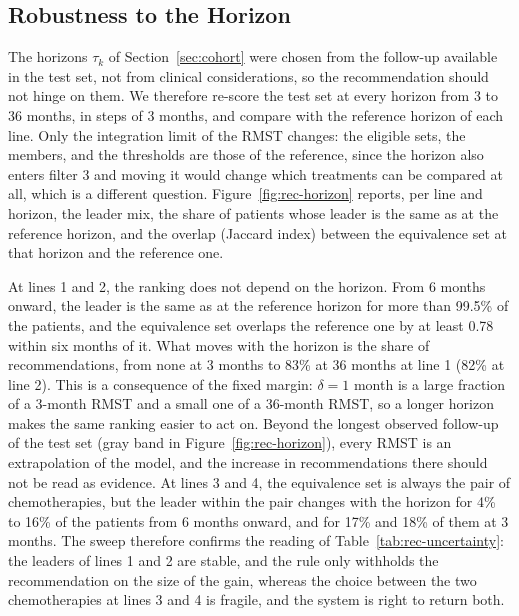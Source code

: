 \documentclass[a4paper,10pt]{article}
\begin{document}
\subsection{Robustness to the Horizon}
\label{sec:rec-horizon}

The horizons $\tau_k$ of Section~\ref{sec:cohort} were chosen from the follow-up available in the test set, not from clinical considerations, so the recommendation should not hinge on them. We therefore re-score the test set at every horizon from 3 to 36 months, in steps of 3 months, and compare with the reference horizon of each line. Only the integration limit of the RMST changes: the eligible sets, the members, and the thresholds are those of the reference, since the horizon also enters filter 3 and moving it would change which treatments can be compared at all, which is a different question. Figure~\ref{fig:rec-horizon} reports, per line and horizon, the leader mix, the share of patients whose leader is the same as at the reference horizon, and the overlap (Jaccard index) between the equivalence set at that horizon and the reference one.

At lines 1 and 2, the ranking does not depend on the horizon. From 6 months onward, the leader is the same as at the reference horizon for more than 99.5\% of the patients, and the equivalence set overlaps the reference one by at least 0.78 within six months of it. What moves with the horizon is the share of recommendations, from none at 3 months to 83\% at 36 months at line 1 (82\% at line 2). This is a consequence of the fixed margin: $\delta = 1$ month is a large fraction of a 3-month RMST and a small one of a 36-month RMST, so a longer horizon makes the same ranking easier to act on. Beyond the longest observed follow-up of the test set (gray band in Figure~\ref{fig:rec-horizon}), every RMST is an extrapolation of the model, and the increase in recommendations there should not be read as evidence. At lines 3 and 4, the equivalence set is always the pair of chemotherapies, but the leader within the pair changes with the horizon for 4\% to 16\% of the patients from 6 months onward, and for 17\% and 18\% of them at 3 months. The sweep therefore confirms the reading of Table~\ref{tab:rec-uncertainty}: the leaders of lines 1 and 2 are stable, and the rule only withholds the recommendation on the size of the gain, whereas the choice between the two chemotherapies at lines 3 and 4 is fragile, and the system is right to return both.
\end{document}
